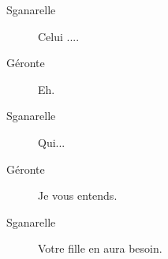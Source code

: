 \documentclass[french,twoside]{book} %
\begin{document}
 \begin{description} \item[Sganarelle] 

Celui ....\end{description}
 \begin{description} \item[Géronte] 

Eh.\end{description}
 \begin{description} \item[Sganarelle] 

Qui...\end{description}
 \begin{description} \item[Géronte] 

Je vous entends.\end{description}
 \begin{description} \item[Sganarelle] 

Votre fille en aura besoin.\end{description}
\end{document}

